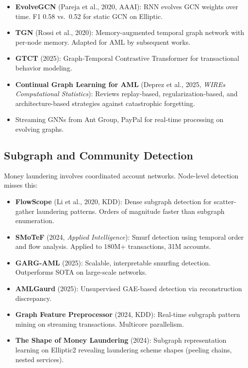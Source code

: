 \documentclass[11pt]{article}
\begin{document}
\begin{itemize}
\item \textbf{EvolveGCN} (Pareja et al., 2020, AAAI): RNN evolves GCN weights over time. F1 0.58 vs.\ 0.52 for static GCN on Elliptic.
\item \textbf{TGN} (Rossi et al., 2020): Memory-augmented temporal graph network with per-node memory. Adapted for AML by subsequent works.
\item \textbf{GTCT} (2025): Graph-Temporal Contrastive Transformer for transactional behavior modeling.
\item \textbf{Continual Graph Learning for AML} (Deprez et al., 2025, \textit{WIREs Computational Statistics}): Reviews replay-based, regularization-based, and architecture-based strategies against catastrophic forgetting.
\item Streaming GNNs from Ant Group, PayPal for real-time processing on evolving graphs.
\end{itemize}

\subsection{Subgraph and Community Detection}

Money laundering involves coordinated account networks. Node-level detection misses this:

\begin{itemize}
\item \textbf{FlowScope} (Li et al., 2020, KDD): Dense subgraph detection for scatter-gather laundering patterns. Orders of magnitude faster than subgraph enumeration.
\item \textbf{SMoTeF} (2024, \textit{Applied Intelligence}): Smurf detection using temporal order and flow analysis. Applied to 180M+ transactions, 31M accounts.
\item \textbf{GARG-AML} (2025): Scalable, interpretable smurfing detection. Outperforms SOTA on large-scale networks.
\item \textbf{AMLGaurd} (2025): Unsupervised GAE-based detection via reconstruction discrepancy.
\item \textbf{Graph Feature Preprocessor} (2024, KDD): Real-time subgraph pattern mining on streaming transactions. Multicore parallelism.
\item \textbf{The Shape of Money Laundering} (2024): Subgraph representation learning on Elliptic2 revealing laundering scheme shapes (peeling chains, nested services).
\end{itemize}
\end{document}
